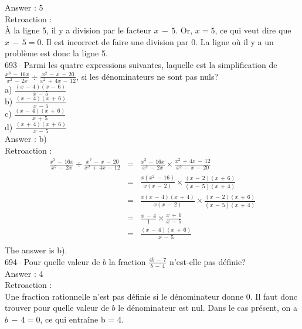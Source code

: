 ﻿\documentclass[letterpaper, 12pt]{article}
\begin{document}
Answer : 5\\

Retroaction : \\
\`A la ligne 5, il y a division par le facteur $x\,-\,5$.  Or, $x=5$, ce qui
veut dire que $x\,-\,5=0$.  Il est incorrect de faire une division par 0.
La ligne o\`u il y a un probl\`eme est donc la ligne 5.\\

693-- Parmi les quatre expressions suivantes, laquelle est la simplification
de $\frac{x^{3}\,-\,16x}{x^{2}\,-\,2x}\div
\frac{x^{2}\,-\,x\,-\,20}{x^{2}\,+\,4x\,-\,12}$, si les d\'enominateurs ne
sont pas nuls?\\
a) $\frac{(x\,-\,4)(x\,-\,6)}{x\,-\,5}$\\[2mm]
b) $\frac{(x\,-\,4)(x\,+\,6)}{x\,-\,5}$\\[2mm]
c) $\frac{(x\,-\,4)(x\,+\,6)}{x\,+\,5}$\\[2mm]
d) $\frac{(x\,+\,4)(x\,+\,6)}{x\,-\,5}$\\

Answer : b)\\

Retroaction : \\
\begin{eqnarray*}
\frac{x^{3}\,-\,16x}{x^{2}\,-\,2x}\div
\frac{x^{2}\,-\,x\,-\,20}{x^{2}\,+\,4x\,-\,12}&=&\frac{x^{3}\,-\,16x}{x^{2}\,-\,2x}\times\frac{x^{2}\,+\,4x\,-\,12}{x^{2}\,-\,x\,-\,20}\\[2mm]
&=&\frac{x(x^{2}\,-\,16)}{x(x\,-\,2)}\times
\frac{(x\,-\,2)(x\,+\,6)}{(x\,-\,5)(x\,+\,4)}\\[2mm]
&=&\frac{x(x\,-\,4)(x\,+\,4)}{x(x\,-\,2)}\times\frac{(x\,-\,2)(x\,+\,6)}{(x\,-\,5)(x\,+\,4)}\\[2mm]
&=&\frac{x\,-\,4}{1}\times \frac{x\,+\,6}{x\,-\,5}\\[2mm]
&=&\frac{(x\,-\,4)(x\,+\,6)}{x\,-\,5}\\[2mm]
\end{eqnarray*}
The answer is b).\\

694-- Pour quelle valeur de $b$ la fraction $\frac{4b\,-\,7}{b\,-\,4}$
n'est-elle pas d\'efinie?\\

Answer : 4\\

Retroaction : \\
Une fraction rationnelle n'est pas d\'efinie si le d\'enominateur donne 0.
Il faut donc trouver pour quelle valeur de $b$ le d\'enominateur est nul.
Dans le cas pr\'esent, on a $b\,-\,4=0$, ce qui entra\^ine b = 4.\\
\end{document}

